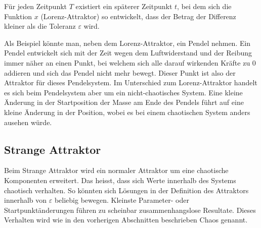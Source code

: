 Für jeden Zeitpunkt $T$ existiert ein späterer Zeitpunkt $t$, bei dem sich die Funktion $x$ (Lorenz-Attraktor) so entwickelt, dass der Betrag der Differenz kleiner als die Toleranz $\varepsilon$ wird. 

Als Beispiel könnte man, neben dem Lorenz-Attraktor, ein Pendel nehmen. Ein Pendel entwickelt sich mit der Zeit wegen dem Luftwiderstand und der Reibung immer näher an einen Punkt, bei welchem sich alle darauf wirkenden Kräfte zu 0 addieren und sich das Pendel nicht mehr bewegt. Dieser Punkt ist also der Attraktor für dieses Pendelsystem. Im Unterschied zum Lorenz-Attraktor handelt es sich beim Pendelsystem aber um ein nicht-chaotisches System. Eine kleine Änderung in der Startposition der Masse am Ende des Pendels führt auf eine kleine Änderung in der Position, wobei es bei einem chaotischen System anders ausehen würde. 

\subsection{Strange Attraktor}
Beim Strange Attraktor wird ein normaler Attraktor um eine chaotische Komponenten erweitert. Das heisst, dass sich Werte innerhalb des Systems chaotisch verhalten. So könnten sich Lösungen in der Definition des Attraktors innerhalb von $\varepsilon$ beliebig bewegen. Kleinste Parameter- oder Startpunktänderungen führen zu scheinbar zusammenhangslose Resultate. Dieses Verhalten wird wie in den vorherigen Abschnitten beschrieben Chaos genannt.

